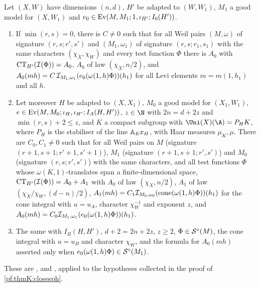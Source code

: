 \begin{proposition}\label{pf:thmK:gen}
Let $(X,W)$ have dimensions $(n,d)$, $H'$ be adapted to $(W,W_1)$, $M_1$ a good model for $(X,W_1)$ and
$e_0\in\operatorname{Ev}(M,M_1;1,\iota_{H'};I_0(H'))$.
\begin{enumerate}
\item If $\min(r,s)=0$, there is $C\ne0$ such that for all Weil pairs $(M,\omega)$ of signature $(r,s;r',s')$ and
$(M_1,\omega_1)$ of signature $(r,s;r_1,s_1)$ with the same characters $(\chi_X,\chi_W)$ and every test function $\Phi$
there is $A_0$ with $\operatorname{CT}_{H'}(\mathcal{I}(\Phi))=A_0$, $A_0$ of law $(\chi_X,n/2)$, and $A_0(mh)=C\,\mathcal{I}_{M_1,\omega_1}
(e_0(\omega(1,h)\Phi))(h_1)$ for all Levi elements $m=m(1,h_1)$ and all $h$.
\item Let moreover $H$ be adapted to $(X,X_1)$, $M_0$ a good model for $(X_1,W_1)$,
$e\in\operatorname{Ev}(M,M_0;\iota_H,\iota_{H'};I_A(H,H'))$, $z\in\N$ with $2n=d+2z$ and $\min(r,s)+2\le z$, and $K$ a compact
subgroup with $\Uni(X)(\A)=P_HK$, where $P_H$ is the stabiliser of the line $\mathbb{A}_E x_H$, with Haar measures $\mu_K,\mu$.
There are $C_0,C_1\ne0$ such that for all Weil pairs on $M$ (signature $(r+1,s+1;r'+1,s'+1)$), $M_1$ (signature
$(r+1,s+1;r',s')$) and $M_0$ (signature $(r,s;r',s')$) with the same characters, and all test functions $\Phi$ whose
$\omega(K,1)$-translates span a finite-dimensional space, $\operatorname{CT}_{H'}(\mathcal{I}(\Phi))=A_0+A_1$ with $A_0$ of law
$(\chi_X,n/2)$, $A_1$ of law $(\chi_X/\chi_W,(d-n)/2)$, $A_1(mh)=C_1\mathcal{I}_{M_0,\omega_0}(\operatorname{cone}(\omega(1,h)\Phi))(h_1)$
for the cone integral with $u=u_A$, character $\chi_W^{-1}$ and exponent $z$, and $A_0(mh)=C_0\mathcal{I}_{M_1,\omega_1}(e_0(
\omega(1,h)\Phi))(h_1)$.
\item The same with $I_B(H,H')$, $d+2=2n+2z$, $z\ge2$, $\Phi\in\mathcal{S}^{\circ}(M)$, the cone integral with $u=u_B$ and character
$\chi_W$, and the formula for $A_0(mh)$ asserted only when $e_0(\omega(1,h)\Phi)\in\mathcal{S}^{\circ}(M_1)$.
\end{enumerate}
These are ,  and
, applied to the hypotheses collected in the proof of \cref{pf:thmK:closesph}.
\end{proposition}

